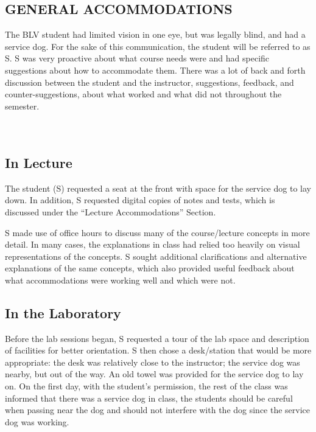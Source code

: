 \documentclass[11.5pt]{sig-alternate} %
\begin{document}
\begin{large}
\section*{GENERAL ACCOMMODATIONS}

The BLV student had limited vision in one eye, but was legally blind, and had a service dog.  For the sake of this communication, the student will be referred to as S.  S was very proactive about what course needs were and had specific suggestions about how to accommodate them.  There was a lot of back and forth discussion between the student and the instructor, suggestions, feedback, and counter-suggestions, about what worked and what did not throughout the semester. 
\\ \\ \\
\subsection*{In Lecture}

The student (S) requested a seat at the front with space for the service dog to lay down.  In addition, S requested digital copies of notes and tests, which is discussed under the “Lecture Accommodations” Section.

S made use of office hours to discuss many of the course/lecture concepts in more detail.  In many cases, the explanations in class had relied too heavily on visual representations of the concepts.  S sought additional clarifications and alternative explanations of the same concepts, which also provided useful feedback about what accommodations were working well and which were not.  

\subsection*{In the Laboratory}

Before the lab sessions began, S requested a tour of the lab space and description of facilities for better orientation.  S then chose a desk/station that would be more appropriate: the desk was relatively close to the instructor; the service dog was nearby, but out of the way.  An old towel was provided for the service dog to lay on.  On the first day, with the student’s permission, the rest of the class was informed that there was a service dog in class, the students should be careful when passing near the dog and should not interfere with the dog since the service dog was working.


\end{large}
\end{document}
